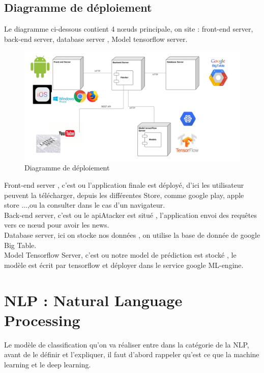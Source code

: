 \subsection{Diagramme de déploiement}
Le diagramme ci-dessous contient 4 nœuds principale, on site : front-end server, back-end server, database server , Model tensorflow server.
\begin{figure}[H]
	\includegraphics[width=\linewidth]{Images/Deployment_Diagram_Sanadtech.png}
	\caption{Diagramme de déploiement}
	\label{fig:deployment}
\end{figure}
Front-end server , c'est ou l'application finale est déployé, d'ici les utilisateur peuvent la télécharger, depuis les différentes Store, comme google play, apple store ...,ou la consulter dans le cas d'un navigateur.\\[0.2cm]
Back-end server, c'est ou le apiAtacker est situé , l'application envoi des requêtes vers ce nœud pour avoir les news.\\[0.2cm]
Database server, ici on stocke nos données , on utilise la base de donnée de google Big Table.\\[0.2cm]
Model Tensorflow Server, c'est ou notre model de prédiction est stocké , le modèle est écrit par tensorflow et déployer dans le service google ML-engine.



\section{NLP : Natural Language Processing}
Le modèle de classification qu'on va réaliser entre  dans la catégorie de la NLP, avant de le définir et l'expliquer, il faut d'abord rappeler qu'est ce que la machine learning et le deep learning.
